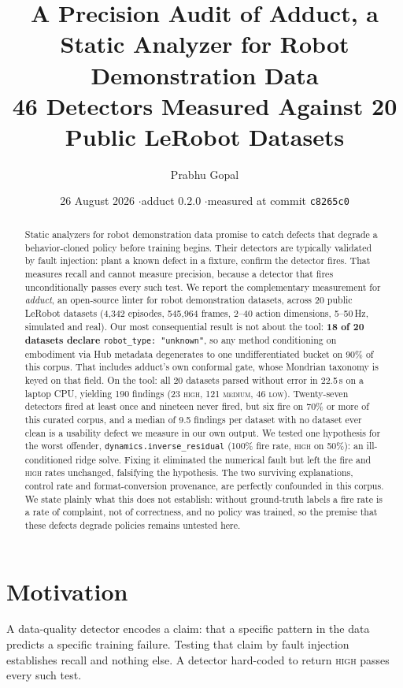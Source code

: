 \documentclass[10pt,a4paper]{article}
\title{\vspace{-2.2em}\textbf{A Precision Audit of Adduct, a Static Analyzer for
Robot Demonstration Data}\\[0.35em]
\large 46 Detectors Measured Against 20 Public LeRobot Datasets}
\author{Prabhu Gopal}
\date{26 August 2026 \quad$\cdot$\quad adduct 0.2.0 \quad$\cdot$\quad measured at commit \texttt{c8265c0}}
\newcommand{\dtr}[1]{\texttt{\small #1}}
\begin{document}
\maketitle

\begin{abstract}
\noindent
Static analyzers for robot demonstration data promise to catch defects that degrade a
behavior-cloned policy before training begins. Their detectors are typically validated by
fault injection: plant a known defect in a fixture, confirm the detector fires. That
measures recall and cannot measure precision, because a detector that fires unconditionally
passes every such test. We report the complementary measurement for \emph{adduct}, an
open-source linter for robot demonstration datasets, across 20 public LeRobot datasets (4{,}342 episodes,
545{,}964 frames, 2--40 action dimensions, 5--50\,Hz, simulated and real).
Our most consequential result is not about the tool: \textbf{18 of 20 datasets declare}
\mbox{\texttt{robot\_type:\,"unknown"}}, so any method conditioning on embodiment via Hub
metadata degenerates to one undifferentiated bucket on 90\% of this corpus. That includes
adduct's own conformal gate, whose Mondrian taxonomy is keyed on that field.
On the tool: all 20 datasets parsed without error in 22.5\,s on a laptop CPU, yielding 190
findings (23 \textsc{high}, 121 \textsc{medium}, 46 \textsc{low}). Twenty-seven detectors
fired at least once and nineteen never fired, but six fire on 70\% or more of this curated
corpus, and a median of 9.5 findings per dataset with no dataset ever clean is a usability
defect we measure in our own output. We tested one hypothesis for the worst offender,
\dtr{dynamics.inverse\_residual} (100\% fire rate, \textsc{high} on 50\%): an
ill-conditioned ridge solve. Fixing it eliminated the numerical fault but left the fire and
\textsc{high} rates unchanged, falsifying the hypothesis. The two surviving explanations,
control rate and format-conversion provenance, are perfectly confounded in this corpus. We
state plainly what this does not establish: without ground-truth labels a fire rate is a
rate of complaint, not of correctness, and no policy was trained, so the premise that these
defects degrade policies remains untested here.
\end{abstract}

\section{Motivation}

A data-quality detector encodes a claim: that a specific pattern in the data predicts a
specific training failure. Testing that claim by fault injection establishes recall and
nothing else. A detector hard-coded to return \textsc{high} passes every such test.
\end{document}
